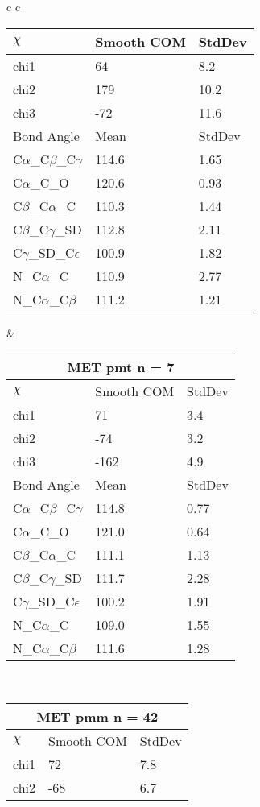 \begin{longtable}{ c c }
\begin{tabular}{ l l l }
  $\chi$       & Smooth COM & StdDev \\ \midrule
  chi1 & 64 & 8.2 \\ 
  chi2 & 179 & 10.2 \\ 
  chi3 & -72 & 11.6 \\ \midrule
  Bond Angle   & Mean     & StdDev \\ \midrule
  C$\alpha$\_C$\beta$\_C$\gamma$ & 114.6 & 1.65\\
  C$\alpha$\_C\_O & 120.6 & 0.93\\
  C$\beta$\_C$\alpha$\_C & 110.3 & 1.44\\
  C$\beta$\_C$\gamma$\_SD & 112.8 & 2.11\\
  C$\gamma$\_SD\_C$\epsilon$ & 100.9 & 1.82\\
  N\_C$\alpha$\_C & 110.9 & 2.77\\
  N\_C$\alpha$\_C$\beta$ & 111.2 & 1.21\\
  \bottomrule
  \end{tabular}
  &
  \begin{tabular}{ l l l }
  \toprule
  \multicolumn{3}{c}{MET \textbf{pmt} n = 7} \\ \toprule
  $\chi$       & Smooth COM & StdDev \\ \midrule
  chi1 & 71 & 3.4 \\ 
  chi2 & -74 & 3.2 \\ 
  chi3 & -162 & 4.9 \\ \midrule
  Bond Angle   & Mean     & StdDev \\ \midrule
  C$\alpha$\_C$\beta$\_C$\gamma$ & 114.8 & 0.77\\
  C$\alpha$\_C\_O & 121.0 & 0.64\\
  C$\beta$\_C$\alpha$\_C & 111.1 & 1.13\\
  C$\beta$\_C$\gamma$\_SD & 111.7 & 2.28\\
  C$\gamma$\_SD\_C$\epsilon$ & 100.2 & 1.91\\
  N\_C$\alpha$\_C & 109.0 & 1.55\\
  N\_C$\alpha$\_C$\beta$ & 111.6 & 1.28\\
  \bottomrule
  \end{tabular}
  \\
  \begin{tabular}{ l l l }
  \toprule
  \multicolumn{3}{c}{MET \textbf{pmm} n = 42} \\ \toprule
  $\chi$       & Smooth COM & StdDev \\ \midrule
  chi1 & 72 & 7.8 \\ 
  chi2 & -68 & 6.7 \\ 

\end{tabular}
\end{longtable}
